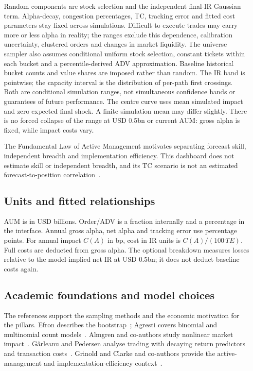 \documentclass[11pt,a4paper]{article}
\begin{document}
Random components are stock selection and the independent final-IR Gaussian term. Alpha-decay, congestion percentages, TC, tracking error and fitted cost parameters stay fixed across simulations. Difficult-to-execute trades may carry more or less alpha in reality; the ranges exclude this dependence, calibration uncertainty, clustered orders and changes in market liquidity. The universe sampler also assumes conditional uniform stock selection, constant tickets within each bucket and a percentile-derived ADV approximation. Baseline historical bucket counts and value shares are imposed rather than random. The IR band is pointwise; the capacity interval is the distribution of per-path first crossings. Both are conditional simulation ranges, not simultaneous confidence bands or guarantees of future performance. The centre curve uses mean simulated impact and zero expected final shock. A finite simulation mean may differ slightly. There is no forced collapse of the range at USD 0.5bn or current AUM: gross alpha is fixed, while impact costs vary.

The Fundamental Law of Active Management motivates separating forecast skill, independent breadth and implementation efficiency. This dashboard does not estimate skill or independent breadth, and its TC scenario is not an estimated forecast-to-position correlation~\cite{grinold,clarke}.

\subsection{Units and fitted relationships}
AUM is in USD billions. Order/ADV is a fraction internally and a percentage in the interface. Annual gross alpha, net alpha and tracking error use percentage points. For annual impact $C(A)$ in bp, cost in IR units is $C(A)/(100\,TE)$. Full costs are deducted from gross alpha. The optional breakdown measures losses relative to the model-implied net IR at USD 0.5bn; it does not deduct baseline costs again.

\subsection{Academic foundations and model choices}
The references support the sampling methods and the economic motivation for the pillars. Efron describes the bootstrap~\cite{efron}; Agresti covers binomial and multinomial count models~\cite{agresti}. Almgren and co-authors study nonlinear market impact~\cite{almgren}. G\^arleanu and Pedersen analyse trading with decaying return predictors and transaction costs~\cite{garleanu}. Grinold and Clarke and co-authors provide the active-management and implementation-efficiency context~\cite{grinold,clarke}.
\end{document}
